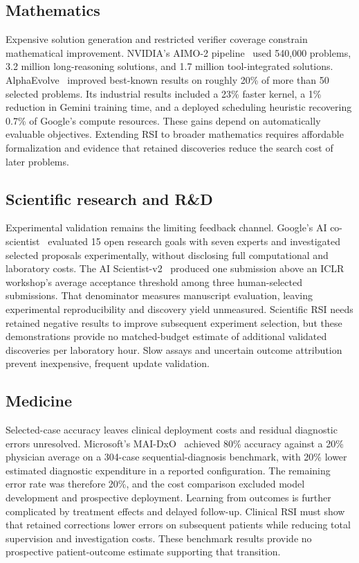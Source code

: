 \subsection{Mathematics}
Expensive solution generation and restricted verifier coverage constrain mathematical improvement. NVIDIA's AIMO-2 pipeline~\cite{nvidia2025aimo} used 540,000 problems, 3.2 million long-reasoning solutions, and 1.7 million tool-integrated solutions. AlphaEvolve~\cite{deepmind2025alphaevolve} improved best-known results on roughly 20\% of more than 50 selected problems. Its industrial results included a 23\% faster kernel, a 1\% reduction in Gemini training time, and a deployed scheduling heuristic recovering 0.7\% of Google's compute resources. These gains depend on automatically evaluable objectives. Extending RSI to broader mathematics requires affordable formalization and evidence that retained discoveries reduce the search cost of later problems.

\subsection{Scientific research and R\&D}
Experimental validation remains the limiting feedback channel. Google's AI co-scientist~\cite{gottweis2025coscientist} evaluated 15 open research goals with seven experts and investigated selected proposals experimentally, without disclosing full computational and laboratory costs. The AI Scientist-v2~\cite{yamada2025aiscientistv2} produced one submission above an ICLR workshop's average acceptance threshold among three human-selected submissions. That denominator measures manuscript evaluation, leaving experimental reproducibility and discovery yield unmeasured. Scientific RSI needs retained negative results to improve subsequent experiment selection, but these demonstrations provide no matched-budget estimate of additional validated discoveries per laboratory hour. Slow assays and uncertain outcome attribution prevent inexpensive, frequent update validation.

\subsection{Medicine}
Selected-case accuracy leaves clinical deployment costs and residual diagnostic errors unresolved. Microsoft's MAI-DxO~\cite{microsoft2025diagnosis} achieved 80\% accuracy against a 20\% physician average on a 304-case sequential-diagnosis benchmark, with 20\% lower estimated diagnostic expenditure in a reported configuration. The remaining error rate was therefore 20\%, and the cost comparison excluded model development and prospective deployment. Learning from outcomes is further complicated by treatment effects and delayed follow-up. Clinical RSI must show that retained corrections lower errors on subsequent patients while reducing total supervision and investigation costs. These benchmark results provide no prospective patient-outcome estimate supporting that transition.

